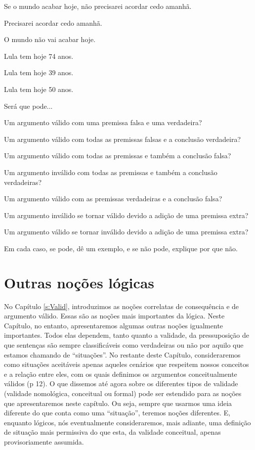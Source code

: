 \begin{earg}
\item Se o mundo acabar hoje, não precisarei acordar cedo amanhã.
\item Precisarei acordar cedo amanhã.
\item[\therefore] O mundo não vai acabar hoje.
\end{earg}

\begin{earg}
\item Lula tem hoje 74 anos.
\item Lula tem hoje 39 anos.
\item[\therefore] Lula tem hoje 50 anos.
\end{earg}

\problempart
\label{pr.EnglishCombinations}
Será que pode...
	\begin{earg}
		\item Um argumento válido com uma premissa falsa e uma verdadeira?
		\item Um argumento válido com todas as premissas falsas e a conclusão verdadeira?
		\item Um argumento válido com todas as premissas e também a conclusão falsa?
		\item Um argumento inválido com todas as premissas e também a conclusão verdadeiras?
		\item Um argumento válido com as premissas verdadeiras e a conclusão falsa?
		\item Um argumento inválido se tornar válido devido a adição de uma premissa extra?
		\item Um argumento válido se tornar inválido devido a adição de uma premissa extra?
	\end{earg}
Em cada caso, se pode, dê um exemplo, e se não pode, explique por que não.




\chapter{Outras noções lógicas}\label{s:BasicNotions}

No Capítulo \ref{s:Valid}, introduzimos as noções correlatas de consequência e de argumento válido.
Essas são as noções mais importantes da lógica.
Neste Capítulo, no entanto, apresentaremos algumas outras noções igualmente importantes.
Todos elas dependem, tanto quanto a validade, da pressuposição de que sentenças são sempre classificáveis como  verdadeiras ou não por aquilo que estamos chamando de ``situações''.
No restante deste Capítulo, consideraremos como situações aceitáveis apenas aqueles cenários que respeitem nossos conceitos e a relação entre eles, com os quais definimos os argumentos conceitualmente válidos (p 12).
O que dissemos até agora sobre os diferentes tipos de validade (validade nomológica, conceitual ou formal) pode ser estendido para as noções que apresentaremos neste capítulo. Ou seja, sempre que usarmos uma ideia diferente do que conta como uma ``situação'', teremos noções diferentes.
E, enquanto lógicos, nós eventualmente consideraremos, mais adiante, uma definição de situação mais permissiva do que esta, da validade conceitual, apenas provisoriamente assumida.

